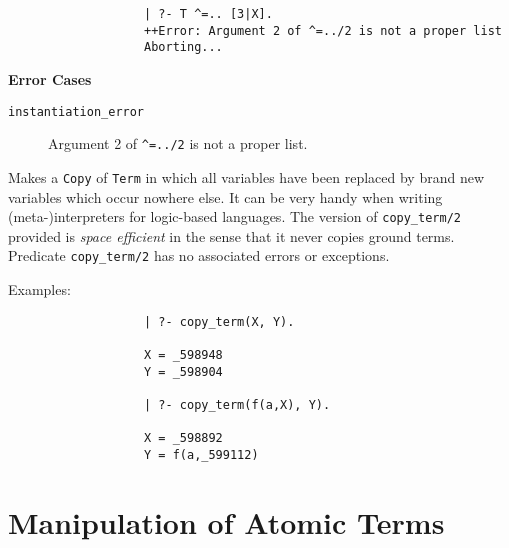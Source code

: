 \begin{description}
{\begin{verbatim}
                   | ?- T ^=.. [3|X].
                   ++Error: Argument 2 of ^=../2 is not a proper list
                   Aborting...
     \end{verbatim}}

{\bf Error Cases}
     \begin{description}
     \item[{\tt instantiation\_error}]
	Argument 2 of {\tt \verb|^|=../2} is not a proper list.
     \end{description}

    Makes a {\tt Copy} of {\tt Term} in which all variables have been
    replaced by brand new variables which occur nowhere else. It can
    be very handy when writing (meta-)interpreters for logic-based
    languages.  The version of {\tt copy\_term/2} provided is {\em space
    efficient} in the sense that it never copies ground terms. 
    Predicate {\tt copy\_term/2} has no associated errors or exceptions.

    Examples:
    {\footnotesize
     \begin{verbatim}
                   | ?- copy_term(X, Y).

                   X = _598948
                   Y = _598904

                   | ?- copy_term(f(a,X), Y).

                   X = _598892
                   Y = f(a,_599112)
     \end{verbatim}}

\end{description}

\section{Manipulation of Atomic Terms}


